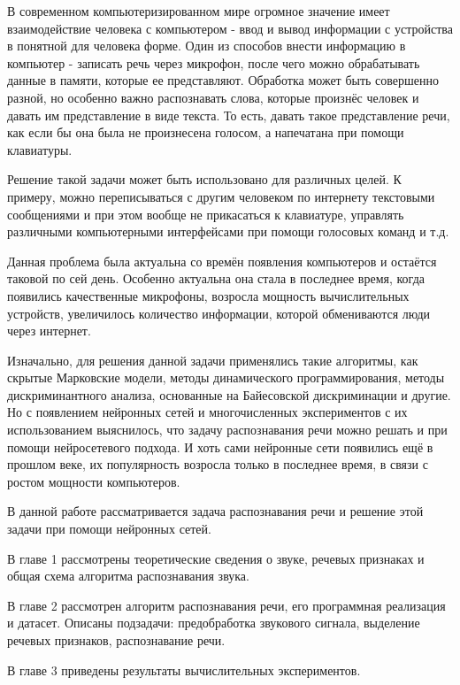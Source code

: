 В современном компьютеризированном мире огромное значение имеет взаимодействие человека с компьютером - ввод и вывод информации с устройства в понятной для человека форме. Один из способов внести информацию в компьютер - записать речь через микрофон, после чего можно обрабатывать данные в памяти, которые ее представляют. Обработка может быть совершенно разной, но особенно важно распознавать слова, которые произнёс человек и давать им представление в виде текста. То есть, давать такое представление речи, как если бы она была не произнесена голосом, а напечатана при помощи клавиатуры. 

Решение такой задачи может быть использовано для различных целей. К примеру, можно переписываться с другим человеком по интернету текстовыми сообщениями и при этом вообще не прикасаться к клавиатуре, управлять различными компьютерными интерфейсами при помощи голосовых команд и т.д.

Данная проблема была актуальна со времён появления компьютеров и остаётся таковой по сей день. Особенно актуальна она стала в последнее время, когда появились качественные микрофоны, возросла мощность вычислительных устройств, увеличилось количество информации, которой обмениваются люди через интернет.

Изначально, для решения данной задачи применялись такие алгоритмы, как скрытые Марковские модели, методы динамического программирования, методы дискриминантного анализа, основанные на Байесовской дискриминации и другие. Но с появлением нейронных сетей и многочисленных экспериментов с их использованием выяснилось, что задачу распознавания речи можно решать и при помощи нейросетевого подхода. И хоть сами нейронные сети появились ещё в прошлом веке, их популярность возросла только в последнее время, в связи с ростом мощности компьютеров.

В данной работе рассматривается задача распознавания речи и решение этой задачи при помощи нейронных сетей.

В главе 1 рассмотрены теоретические сведения о звуке, речевых признаках и общая схема алгоритма распознавания звука. 
 
В главе 2 рассмотрен алгоритм распознавания речи, его программная реализация и датасет. Описаны подзадачи: предобработка звукового сигнала, выделение речевых признаков, распознавание речи.

В главе 3 приведены результаты вычислительных экспериментов.